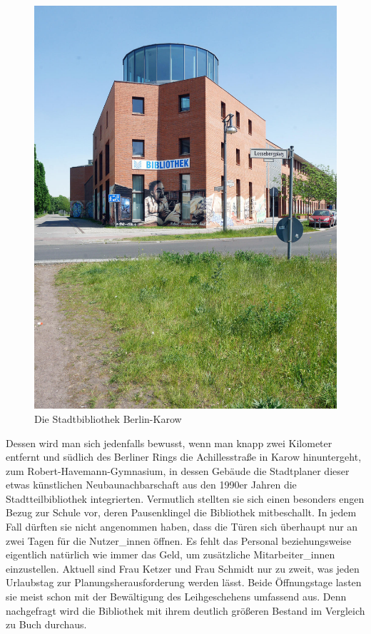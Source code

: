 \documentclass[a4paper,
fontsize=11pt,
oneside,
numbers=noperiodatend,
parskip=half-,
bibliography=totoc,
final
]{scrartcl}
\begin{document}
\begin{figure}
\centering
\includegraphics{img/Bibliothek-karow-1.jpg}
\caption{Die Stadtbibliothek Berlin-Karow}
\end{figure}

Dessen wird man sich jedenfalls bewusst, wenn man knapp zwei Kilometer
entfernt und südlich des Berliner Rings die Achillesstraße in Karow
hinuntergeht, zum Robert-Havemann-Gymnasium, in dessen Gebäude die
Stadtplaner dieser etwas künstlichen Neubaunachbarschaft aus den 1990er
Jahren die Stadtteilbibliothek integrierten. Vermutlich stellten sie
sich einen besonders engen Bezug zur Schule vor, deren Pausenklingel die
Bibliothek mitbeschallt. In jedem Fall dürften sie nicht angenommen
haben, dass die Türen sich überhaupt nur an zwei Tagen für die
Nutzer\_innen öffnen. Es fehlt das Personal beziehungsweise eigentlich
natürlich wie immer das Geld, um zusätzliche Mitarbeiter\_innen
einzustellen. Aktuell sind Frau Ketzer und Frau Schmidt nur zu zweit,
was jeden Urlaubstag zur Planungsherausforderung werden lässt. Beide
Öffnungstage lasten sie meist schon mit der Bewältigung des
Leihgeschehens umfassend aus. Denn nachgefragt wird die Bibliothek mit
ihrem deutlich größeren Bestand im Vergleich zu Buch durchaus.
\end{document}
